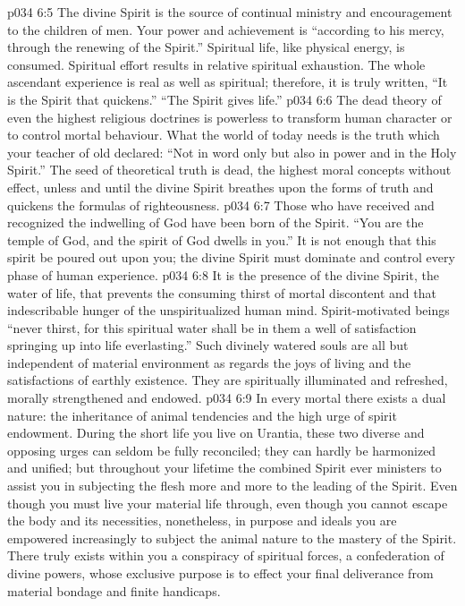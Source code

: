 \vs p034 6:5 \pc The divine Spirit is the source of continual ministry and encouragement to the children of men. Your power and achievement is “according to his mercy, through the renewing of the Spirit.” Spiritual life, like physical energy, is consumed. Spiritual effort results in relative spiritual exhaustion. The whole ascendant experience is real as well as spiritual; therefore, it is truly written, “It is the Spirit that quickens.” “The Spirit gives life.”
\vs p034 6:6 The dead theory of even the highest religious doctrines is powerless to transform human character or to control mortal behaviour. What the world of today needs is the truth which your teacher of old declared: “Not in word only but also in power and in the Holy Spirit.” The seed of theoretical truth is dead, the highest moral concepts without effect, unless and until the divine Spirit breathes upon the forms of truth and quickens the formulas of righteousness.
\vs p034 6:7 Those who have received and recognized the indwelling of God have been born of the Spirit. “You are the temple of God, and the spirit of God dwells in you.” It is not enough that this spirit be poured out upon you; the divine Spirit must dominate and control every phase of human experience.
\vs p034 6:8 It is the presence of the divine Spirit, the water of life, that prevents the consuming thirst of mortal discontent and that indescribable hunger of the unspiritualized human mind. Spirit\hyp{}motivated beings “never thirst, for this spiritual water shall be in them a well of satisfaction springing up into life everlasting.” Such divinely watered souls are all but independent of material environment as regards the joys of living and the satisfactions of earthly existence. They are spiritually illuminated and refreshed, morally strengthened and endowed.
\vs p034 6:9 \pc In every mortal there exists a dual nature: the inheritance of animal tendencies and the high urge of spirit endowment. During the short life you live on Urantia, these two diverse and opposing urges can seldom be fully reconciled; they can hardly be harmonized and unified; but throughout your lifetime the combined Spirit ever ministers to assist you in subjecting the flesh more and more to the leading of the Spirit. Even though you must live your material life through, even though you cannot escape the body and its necessities, nonetheless, in purpose and ideals you are empowered increasingly to subject the animal nature to the mastery of the Spirit. There truly exists within you a conspiracy of spiritual forces, a confederation of divine powers, whose exclusive purpose is to effect your final deliverance from material bondage and finite handicaps.

